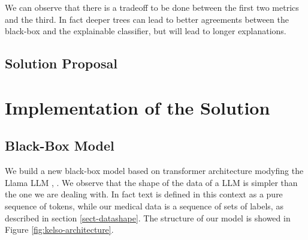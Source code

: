 \documentclass[]{marticle}
\begin{document}
We can observe that there is a tradeoff to be done between the first two metrics and the third. In
fact deeper trees can lead to better agreements between the black-box and the explainable
classifier, but will lead to longer explanations.

\subsection{Solution Proposal}

\section{Implementation of the Solution}

\subsection{Black-Box Model} \label{sect-kelso}

We build a new black-box model based on transformer architecture modyfing the Llama LLM
\cite{llama}, \cite{llama-2}. We observe that the shape of the data of a LLM is simpler than the one
we are dealing with. In fact text is defined in this context as a pure sequence of tokens, while our
medical data is a sequence of sets of labels, as described in section \ref{sect-datashape}. The
structure of our model is showed in Figure \ref{fig:kelso-architecture}.
\end{document}
